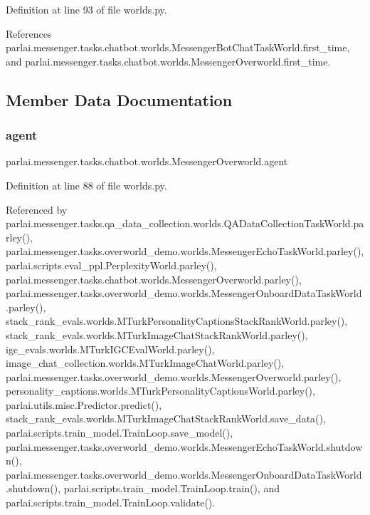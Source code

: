 Definition at line 93 of file worlds.\+py.



References parlai.\+messenger.\+tasks.\+chatbot.\+worlds.\+Messenger\+Bot\+Chat\+Task\+World.\+first\+\_\+time, and parlai.\+messenger.\+tasks.\+chatbot.\+worlds.\+Messenger\+Overworld.\+first\+\_\+time.



\subsection{Member Data Documentation}
\mbox{\label{classparlai_1_1messenger_1_1tasks_1_1chatbot_1_1worlds_1_1MessengerOverworld_ac04cf729ce144a4b861cea71bc3538fc}} 
\subsubsection{\texorpdfstring{agent}{agent}}
{\footnotesize\ttfamily parlai.\+messenger.\+tasks.\+chatbot.\+worlds.\+Messenger\+Overworld.\+agent}



Definition at line 88 of file worlds.\+py.



Referenced by parlai.\+messenger.\+tasks.\+qa\+\_\+data\+\_\+collection.\+worlds.\+Q\+A\+Data\+Collection\+Task\+World.\+parley(), parlai.\+messenger.\+tasks.\+overworld\+\_\+demo.\+worlds.\+Messenger\+Echo\+Task\+World.\+parley(), parlai.\+scripts.\+eval\+\_\+ppl.\+Perplexity\+World.\+parley(), parlai.\+messenger.\+tasks.\+chatbot.\+worlds.\+Messenger\+Overworld.\+parley(), parlai.\+messenger.\+tasks.\+overworld\+\_\+demo.\+worlds.\+Messenger\+Onboard\+Data\+Task\+World.\+parley(), stack\+\_\+rank\+\_\+evals.\+worlds.\+M\+Turk\+Personality\+Captions\+Stack\+Rank\+World.\+parley(), stack\+\_\+rank\+\_\+evals.\+worlds.\+M\+Turk\+Image\+Chat\+Stack\+Rank\+World.\+parley(), igc\+\_\+evals.\+worlds.\+M\+Turk\+I\+G\+C\+Eval\+World.\+parley(), image\+\_\+chat\+\_\+collection.\+worlds.\+M\+Turk\+Image\+Chat\+World.\+parley(), parlai.\+messenger.\+tasks.\+overworld\+\_\+demo.\+worlds.\+Messenger\+Overworld.\+parley(), personality\+\_\+captions.\+worlds.\+M\+Turk\+Personality\+Captions\+World.\+parley(), parlai.\+utils.\+misc.\+Predictor.\+predict(), stack\+\_\+rank\+\_\+evals.\+worlds.\+M\+Turk\+Image\+Chat\+Stack\+Rank\+World.\+save\+\_\+data(), parlai.\+scripts.\+train\+\_\+model.\+Train\+Loop.\+save\+\_\+model(), parlai.\+messenger.\+tasks.\+overworld\+\_\+demo.\+worlds.\+Messenger\+Echo\+Task\+World.\+shutdown(), parlai.\+messenger.\+tasks.\+overworld\+\_\+demo.\+worlds.\+Messenger\+Onboard\+Data\+Task\+World.\+shutdown(), parlai.\+scripts.\+train\+\_\+model.\+Train\+Loop.\+train(), and parlai.\+scripts.\+train\+\_\+model.\+Train\+Loop.\+validate().

